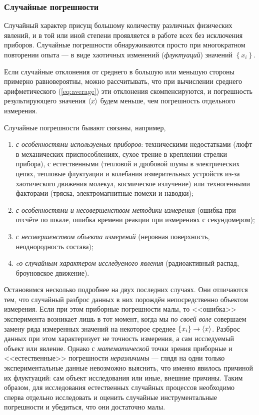 \subsubsection{Случайные погрешности}

Случайный характер присущ большому количеству различных физических
явлений, и в той или иной степени проявляется в работе всех без исключения
приборов. Случайные погрешности обнаруживаются просто при многократном
повторении опыта --- в виде хаотичных изменений (\emph{флуктуаций})
значений $\left\{ x_{i}\right\} $.

Если случайные отклонения от среднего в большую или меньшую стороны
примерно равновероятны, можно рассчитывать, что при вычислении среднего
арифметического (\ref{eq:average}) эти отклонения скомпенсируются,
и погрешность результирующего значения $\left<x\right>$ будем меньше,
чем погрешность отдельного измерения.

Случайные погрешности бывают связаны, например,
\begin{enumerate}

    \item \emph{с особенностями используемых приборов}: техническими
недостатками
(люфт в механических приспособлениях, сухое трение в креплении стрелки
прибора), с естественными (тепловой и дробовой шумы в электрических
цепях, тепловые флуктуации и колебания измерительных устройств из-за
хаотического движения молекул, космическое излучение) или техногенными
факторами (тряска, электромагнитные помехи и наводки);

    \item \emph{с особенностями и несовершенством методики измерения} (ошибка
при отсчёте по шкале, ошибка времени реакции при измерениях с секундомером);

    \item \emph{с несовершенством объекта измерений} (неровная поверхность,
неоднородность состава);

    \item \emph{cо случайным характером исследуемого явления} (радиоактивный
распад, броуновское движение).

\end{enumerate}

Остановимся несколько подробнее на двух последних случаях. Они отличаются
тем, что случайный разброс данных в них порождён непосредственно объектом
измерения. Если при этом приборные погрешности малы, то <<ошибка>>
эксперимента возникает лишь в тот момент, когда мы \emph{по своей
воле} совершаем замену ряда измеренных значений на некоторое среднее
$\left\{ x_{i}\right\} \to\left<x\right>$. Разброс данных при этом
характеризует не точность измерения, а сам исследуемый объект или
явление. Однако с \emph{математической} точки зрения приборные и
<<естественные>>
погрешности \emph{неразличимы} --- глядя на одни только
экспериментальные данные невозможно выяснить, что именно явилось причиной
их флуктуаций: сам объект исследования или иные, внешние причины.
Таким образом, для исследования естественных случайных процессов необходимо
сперва отдельно исследовать и оценить случайные инструментальные погрешности
и убедиться, что они достаточно малы.

